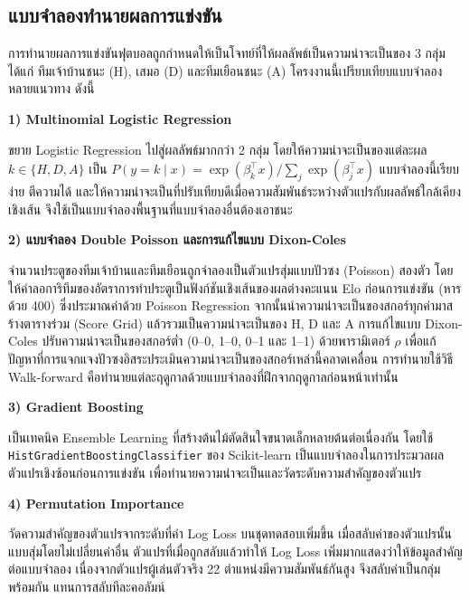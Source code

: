 \subsection{แบบจำลองทำนายผลการแข่งขัน}

การทำนายผลการแข่งขันฟุตบอลถูกกำหนดให้เป็นโจทย์ที่ให้ผลลัพธ์เป็นความน่าจะเป็นของ 3 กลุ่ม ได้แก่ ทีมเจ้าบ้านชนะ (H), เสมอ (D) และทีมเยือนชนะ (A) โครงงานนี้เปรียบเทียบแบบจำลองหลายแนวทาง ดังนี้

\par\noindent\textbf{1) Multinomial Logistic Regression}\par
ขยาย Logistic Regression ไปสู่ผลลัพธ์มากกว่า 2 กลุ่ม โดยให้ความน่าจะเป็นของแต่ละผล $k \in \{H, D, A\}$ เป็น $P(y = k \mid x) = \exp(\beta_k^\top x) / \sum_{j} \exp(\beta_j^\top x)$ แบบจำลองนี้เรียบง่าย ตีความได้ และให้ความน่าจะเป็นที่ปรับเทียบดีเมื่อความสัมพันธ์ระหว่างตัวแปรกับผลลัพธ์ใกล้เคียงเชิงเส้น จึงใช้เป็นแบบจำลองพื้นฐานที่แบบจำลองอื่นต้องเอาชนะ

\par\noindent\textbf{2) แบบจำลอง Double Poisson และการแก้ไขแบบ Dixon-Coles}\par
จำนวนประตูของทีมเจ้าบ้านและทีมเยือนถูกจำลองเป็นตัวแปรสุ่มแบบปัวซง (Poisson) สองตัว โดยให้ค่าลอการิทึมของอัตราการทำประตูเป็นฟังก์ชันเชิงเส้นของผลต่างคะแนน Elo ก่อนการแข่งขัน (หารด้วย 400) ซึ่งประมาณค่าด้วย Poisson Regression จากนั้นนำความน่าจะเป็นของสกอร์ทุกค่ามาสร้างตารางร่วม (Score Grid) แล้วรวมเป็นความน่าจะเป็นของ H, D และ A การแก้ไขแบบ Dixon-Coles \cite{dixon1997modelling} ปรับความน่าจะเป็นของสกอร์ต่ำ (0--0, 1--0, 0--1 และ 1--1) ด้วยพารามิเตอร์ $\rho$ เพื่อแก้ปัญหาที่การแจกแจงปัวซงอิสระประเมินความน่าจะเป็นของสกอร์เหล่านี้คลาดเคลื่อน การทำนายใช้วิธี Walk-forward คือทำนายแต่ละฤดูกาลด้วยแบบจำลองที่ฝึกจากฤดูกาลก่อนหน้าเท่านั้น

\par\noindent\textbf{3) Gradient Boosting}\par
เป็นเทคนิค Ensemble Learning ที่สร้างต้นไม้ตัดสินใจขนาดเล็กหลายต้นต่อเนื่องกัน โดยใช้ \texttt{HistGradientBoostingClassifier} ของ Scikit-learn \cite{scikit-learn} เป็นแบบจำลองในการประมวลผลตัวแปรเชิงซ้อนก่อนการแข่งขัน เพื่อทำนายความน่าจะเป็นและวัดระดับความสำคัญของตัวแปร

\par\noindent\textbf{4) Permutation Importance}\par
วัดความสำคัญของตัวแปรจากระดับที่ค่า Log Loss บนชุดทดสอบเพิ่มขึ้น เมื่อสลับค่าของตัวแปรนั้นแบบสุ่มโดยไม่เปลี่ยนค่าอื่น ตัวแปรที่เมื่อถูกสลับแล้วทำให้ Log Loss เพิ่มมากแสดงว่าให้ข้อมูลสำคัญต่อแบบจำลอง เนื่องจากตัวแปรผู้เล่นตัวจริง 22 ตำแหน่งมีความสัมพันธ์กันสูง จึงสลับค่าเป็นกลุ่มพร้อมกัน แทนการสลับทีละคอลัมน์

